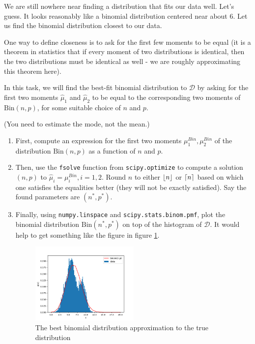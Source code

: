 \begin{tcolorbox}
    We are still nowhere near finding a distribution that fits our data well.
    Let’s guess. It looks reasonably like a binomial distribution centered near
    about 6. Let us find the binomial distribution closest to our data.
    
    One way to define closeness is to ask for the first few moments to be equal
    (it is a theorem in statistics that if every moment of two distributions is
    identical, then the two distributions must be identical as well - we are
    roughly approximating this theorem here).

    In this task, we will find the best-fit binomial distribution to
    $\mathcal{D}$ by asking for the first two moments $\hat{\mu}_1$ and
    $\hat{\mu}_2$ to be equal to the corresponding two moments of $\text{Bin}(n,
    p)$, for some suitable choice of $n$ and $p$.

    (You need to estimate the mode, not the mean.)

    \vspace{10pt}
    \begin{enumerate}
        \item First, compute an expression for the first two moments $\mu^{Bin}_1,
        \mu^{Bin}_2$ of the distribution $\text{Bin}(n, p)$ as a function of $n$
        and $p$.
        \item Then, use the \texttt{fsolve} function from \texttt{scipy.optimize}
        to compute a solution $(n, p)$ to $\hat{\mu}_i = \mu^{Bin}_i, i = 1, 2$.
        Round $n$ to either $\lfloor n\rfloor$ or $\lceil n\rceil$ based on which one
        satisfies the equalities better (they will not be exactly satisfied). Say
        the found parameters are $(n^*, p^*)$.
        \item Finally, using \texttt{numpy.linspace} and
        \texttt{scipy.stats.binom.pmf}, plot the binomial distribution $\text{Bin}
        (n^*, p^*)$ on top of the histogram of $\mathcal{D}$. It would help to get
        something like the figure in figure \ref{fig_q3c}.

        \begin{figure}[H]
            \centering
            \includegraphics[width=0.5\textwidth]{assets/images/q3c.png}
            \caption{The best binomial distribution approximation to the true
            distribution}
            \label{fig_q3c}
        \end{figure}
    \end{enumerate}
\end{tcolorbox}

